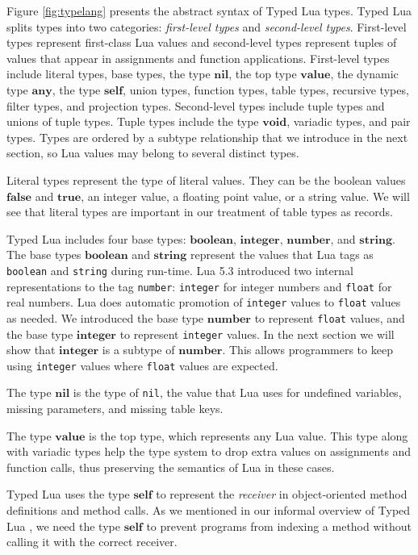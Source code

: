 \documentclass{sigplanconf}
\newcommand{\Value}{\mathbf{value}}
\newcommand{\Any}{\mathbf{any}}
\newcommand{\Nil}{\mathbf{nil}}
\newcommand{\Self}{\mathbf{self}}
\newcommand{\False}{\mathbf{false}}
\newcommand{\True}{\mathbf{true}}
\newcommand{\Boolean}{\mathbf{boolean}}
\newcommand{\Integer}{\mathbf{integer}}
\newcommand{\Number}{\mathbf{number}}
\newcommand{\String}{\mathbf{string}}
\newcommand{\Void}{\mathbf{void}}
\begin{document}
Figure \ref{fig:typelang} presents the abstract syntax of
Typed Lua types.
Typed Lua splits types into two categories:
\emph{first-level types} and \emph{second-level types}.
First-level types represent first-class Lua values and
second-level types represent tuples of values that appear in 
assignments and function applications.
First-level types include literal types, base types, the type $\Nil$,
the top type $\Value$, the dynamic type $\Any$, the type $\Self$,
union types, function types, table types, recursive types,
filter types, and projection types.
Second-level types include tuple types and unions of tuple types.
Tuple types include the type $\Void$, variadic types, and pair types.
Types are ordered by a subtype relationship that we introduce
in the next section, so Lua values may belong to several distinct types.

Literal types represent the type of literal values.
They can be the boolean values $\False$ and $\True$,
an integer value, a floating point value, or a string value.
We will see that literal types are important in our treatment of
table types as records.

Typed Lua includes four base types: $\Boolean$, $\Integer$, $\Number$, and $\String$.
The base types $\Boolean$ and $\String$ represent the values that
Lua tags as \texttt{boolean} and \texttt{string} during run-time.
Lua 5.3 introduced two internal representations to the tag \texttt{number}:
\texttt{integer} for integer numbers and \texttt{float} for real numbers.
Lua does automatic promotion of \texttt{integer} values to \texttt{float}
values as needed.
We introduced the base type $\Number$ to represent \texttt{float} values,
and the base type $\Integer$ to represent \texttt{integer} values.
In the next section we will show that $\Integer$ is a subtype of $\Number$.
This allows programmers to keep using \texttt{integer} values where
\texttt{float} values are expected.

The type $\Nil$ is the type of \texttt{nil}, the value that Lua uses for
undefined variables, missing parameters, and missing table keys.

The type $\Value$ is the top type, which represents any Lua value.
This type along with variadic types help the type system to drop
extra values on assignments and function calls, thus preserving the
semantics of Lua in these cases.

Typed Lua uses the type $\Self$ to represent the \emph{receiver}
in object-oriented method definitions and method calls.
As we mentioned in our informal overview of Typed Lua \cite{maidl2014tl},
we need the type $\Self$ to prevent programs from indexing a method without
calling it with the correct receiver.
\end{document}
